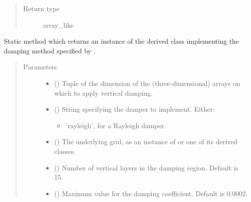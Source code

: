 \documentclass[letterpaper,10pt,english]{sphinxmanual}
\begin{document}
\begin{fulllineitems}
\begin{fulllineitems}
\begin{quote}
\begin{description}
\item[{Return type}] \leavevmode
array\_like

\end{description}\end{quote}

\end{fulllineitems}


\begin{fulllineitems}
\label{\detokenize{api:tasmania.dycore.vertical_damping.VerticalDamping.factory}}
Static method which returns an instance of the derived class implementing the damping method
specified by .
\begin{quote}\begin{description}
\item[{Parameters}] \leavevmode\begin{itemize}
\item {} 
 () \textendash{} Tuple of the dimension of the (three-dimensional) arrays on which to apply vertical damping.

\item {} 
 () \textendash{} 
String specifying the damper to implement. Either:
\begin{itemize}
\item {} 
’rayleigh’, for a Rayleigh damper.

\end{itemize}


\item {} 
 () \textendash{} The underlying grid, as an instance of {\hyperref[\detokenize{api:tasmania.grids.grid_xyz.GridXYZ}]{}} or one of its derived classes.

\item {} 
 () \textendash{} Number of vertical layers in the damping region. Default is 15.

\item {} 
 () \textendash{} Maximum value for the damping coefficient. Default is 0.0002.


\end{itemize}
\end{description}
\end{quote}
\end{fulllineitems}
\end{fulllineitems}
\end{document}
